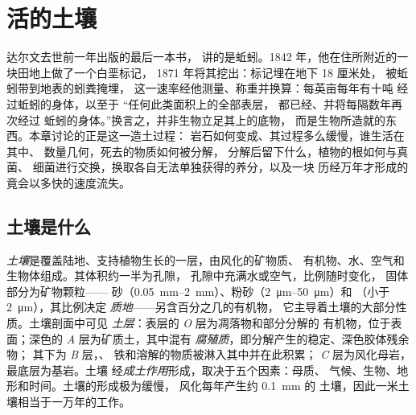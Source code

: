 \chapter{活的土壤}\label{ch:b2:living-soil}

达尔文去世前一年出版的最后一本书，
讲的是蚯蚓。1842 年，他在住所附近的一块田地上做了一个白垩标记，
1871 年将其挖出：标记埋在地下 18 厘米处，
被蚯蚓带到地表的蚓粪掩埋，
这一速率经他测量、称重并换算：每英亩每年有十吨
经过蚯蚓的身体，以至于
“任何此类面积上的全部表层，
都已经、并将每隔数年再次经过
蚯蚓的身体。”换言之，并非生物立足其上的底物，
而是生物所造就的东西。本章讨论的正是这一造土过程：
岩石如何变成、其过程多么缓慢，谁生活在其中、
数量几何，死去的物质如何被分解，
分解后留下什么，植物的根如何与真菌、
细菌进行交换，换取各自无法单独获得的养分，以及一块
历经万年才形成的竟会以多快的速度流失。

\section{土壤是什么}

\begin{definition}[土壤及其土层]\label{def:b2:living-soil:soil}
\emph{土壤}是覆盖陆地、支持植物生长的一层，由风化的矿物质、
有机物、水、空气和生物体组成。其体积约一半为孔隙，
孔隙中充满水或空气，比例随时变化，
固体部分为矿物颗粒——
砂（\qtyrange{0.05}{2}{mm}）、粉砂（\qtyrange{2}{50}{\micro m}）和
（小于 \qty{2}{\micro m}），其比例决定
\emph{质地}——另含百分之几的有机物，
它主导着土壤的大部分性质。土壤剖面中可见
\emph{土层}：表层的 \emph{O} 层为凋落物和部分分解的
有机物，位于表面；深色的 \emph{A} 层为矿质土，其中混有
\emph{腐殖质}，即分解产生的稳定、深色胶体残余物；
其下为 \emph{B} 层，、
铁和溶解的物质被淋入其中并在此积累；
\emph{C} 层为风化母岩，最底层为基岩。土壤
经\emph{成土作用}形成，取决于五个因素：母质、
气候、生物、地形和时间。土壤的形成极为缓慢，
风化每年产生约 \qty{0.1}{mm} 的
土壤，因此一米土壤相当于一万年的工作。
\end{definition}

